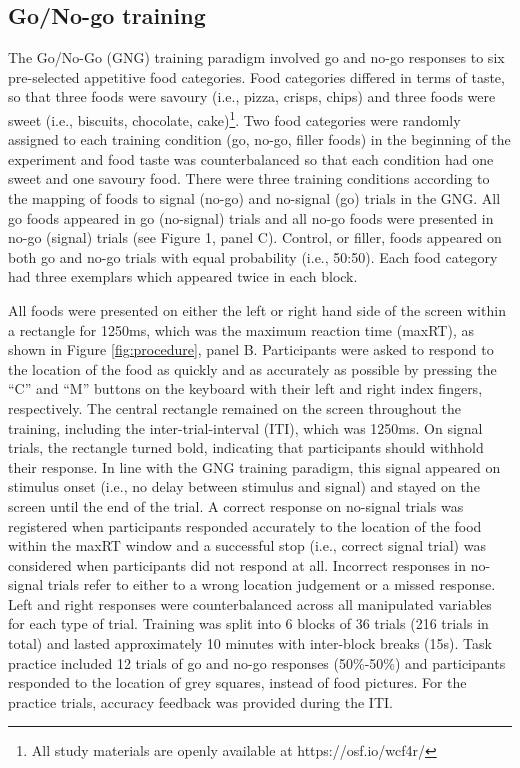 \documentclass[man,floatsintext]{apa6}
\let\rmarkdownfootnote\footnote%
\def\footnote{\protect\rmarkdownfootnote}
\begin{document}
\hypertarget{gng}{%
\subsection{Go/No-go training}\label{gng}}

\par

The Go/No-Go (GNG) training paradigm involved go and no-go responses to six pre-selected appetitive food categories. Food categories differed in terms of taste, so that three foods were savoury (i.e., pizza, crisps, chips) and three foods were sweet (i.e., biscuits, chocolate, cake)\footnote{All study materials are openly available at https://osf.io/wcf4r/}. Two food categories were randomly assigned to each training condition (go, no-go, filler foods) in the beginning of the experiment and food taste was counterbalanced so that each condition had one sweet and one savoury food. There were three training conditions according to the mapping of foods to signal (no-go) and no-signal (go) trials in the GNG. All go foods appeared in go (no-signal) trials and all no-go foods were presented in no-go (signal) trials (see Figure 1, panel C). Control, or filler, foods appeared on both go and no-go trials with equal probability (i.e., 50:50). Each food category had three exemplars which appeared twice in each block.

\par

All foods were presented on either the left or right hand side of the screen within a rectangle for 1250ms, which was the maximum reaction time (maxRT), as shown in Figure \ref{fig:procedure}, panel B. Participants were asked to respond to the location of the food as quickly and as accurately as possible by pressing the \enquote{C} and \enquote{M} buttons on the keyboard with their left and right index fingers, respectively. The central rectangle remained on the screen throughout the training, including the inter-trial-interval (ITI), which was 1250ms. On signal trials, the rectangle turned bold, indicating that participants should withhold their response. In line with the GNG training paradigm, this signal appeared on stimulus onset (i.e., no delay between stimulus and signal) and stayed on the screen until the end of the trial. A correct response on no-signal trials was registered when participants responded accurately to the location of the food within the maxRT window and a successful stop (i.e., correct signal trial) was considered when participants did not respond at all. Incorrect responses in no-signal trials refer to either to a wrong location judgement or a missed response. Left and right responses were counterbalanced across all manipulated variables for each type of trial. Training was split into 6 blocks of 36 trials (216 trials in total) and lasted approximately 10 minutes with inter-block breaks (15s). Task practice included 12 trials of go and no-go responses (50\%-50\%) and participants responded to the location of grey squares, instead of food pictures. For the practice trials, accuracy feedback was provided during the ITI.
\end{document}

